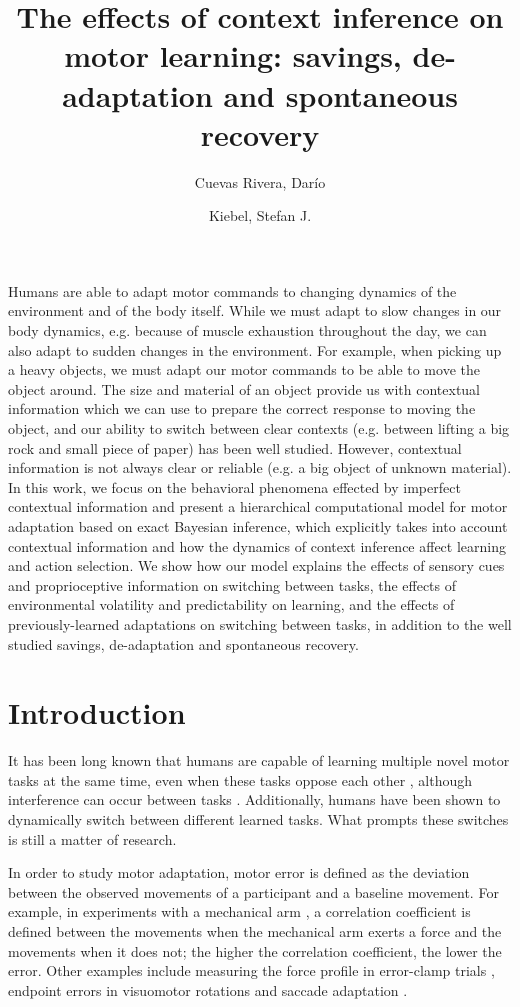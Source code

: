 \documentclass[a4paper,doc,floatsintext,natbib]{apa6}
\title{The effects of context inference on motor learning: savings, de-adaptation and spontaneous recovery}
\author[1]{Cuevas Rivera, Darío}
\author[1]{Kiebel, Stefan J.}
\affil[1]{Chair of Neuroimaging, Faculty of Psychology. Technische Universität Dresden, 01062 Dresden, Germany.}
\affiliation{~}
\begin{document}
\maketitle

Humans are able to adapt motor commands to changing dynamics of the environment and of the body itself. While we must adapt to slow changes in our body dynamics, e.g. because of muscle exhaustion throughout the day, we can also adapt to sudden changes in the environment. For example, when picking up a heavy objects, we must adapt our motor commands to be able to move the object around. The size and material of an object provide us with contextual information which we can use to prepare the correct response to moving the object, and our ability to switch between clear contexts (e.g. between lifting a big rock and small piece of paper) has been well studied. However, contextual information is not always clear or reliable (e.g. a big object of unknown material). In this work, we focus on the behavioral phenomena effected by imperfect contextual information and present a hierarchical computational model for motor adaptation based on exact Bayesian inference, which explicitly takes into account contextual information and how the dynamics of context inference affect learning and action selection. We show how our model explains the effects of sensory cues and proprioceptive information on switching between tasks, the effects of environmental volatility and predictability on learning, and the effects of previously-learned adaptations on switching between tasks, in addition to the well studied savings, de-adaptation and spontaneous recovery.

\section{Introduction}
It has been long known that humans are capable of learning multiple novel motor tasks at the same time, even when these tasks oppose each other \citep[e.g.][]{Gandolfo_Motor_1996,Shadmehr_Functional_1997}, although interference can occur between tasks \citep[e.g.][]{Brashers-Krug_Consolidation_1996,Sing_Reduction_2010}. Additionally, humans have been shown to dynamically switch between different learned tasks. What prompts these switches is still a matter of research.

In order to study motor adaptation, motor error is defined as the deviation between the observed movements of a participant and a baseline movement. For example, in experiments with a mechanical arm \citep[e.g.][]{Gandolfo_Motor_1996}, a correlation coefficient is defined between the movements when the mechanical arm exerts a force and the movements when it does not; the higher the correlation coefficient, the lower the error. Other examples include measuring the force profile in error-clamp trials \citep{Smith_Interacting_2006}, endpoint errors in visuomotor rotations \citep{Kim_Neural_2015} and saccade adaptation \citep{Catz_Cerebellardependent_2008}.
\end{document}
